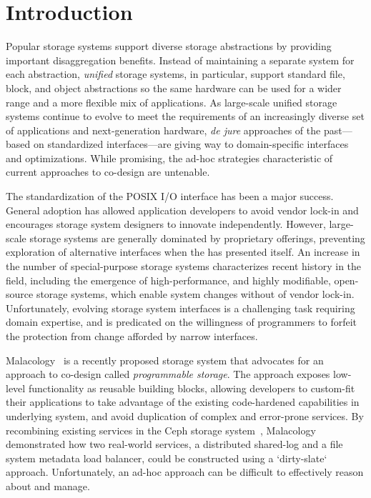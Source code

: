 \section{Introduction}
\label{sec:intro}

Popular storage systems support diverse storage abstractions by
providing important disaggregation benefits. Instead of maintaining
a separate system for each abstraction, \emph{unified} storage
systems, in particular, support standard file, block, and object abstractions so the same
hardware can be used for a wider range and a more flexible mix of applications. 
As large-scale unified storage systems continue to evolve to meet the requirements 
of an increasingly diverse set of applications and next-generation hardware, \emph{de jure}
approaches of the past---based on standardized interfaces---are giving way to
domain-specific interfaces and optimizations. While promising, the ad-hoc strategies characteristic of 
current approaches to co-design are untenable.

The standardization of the POSIX I/O interface has been a major success. General adoption
has allowed application developers to avoid vendor lock-in and encourages storage system
designers to innovate independently. However, large-scale storage systems are generally dominated 
by proprietary offerings, preventing exploration of alternative
interfaces when the has presented itself. An increase in the number of special-purpose storage systems characterizes recent history
in the field, including the emergence of high-performance, and highly modifiable, open-source storage systems, 
which enable system changes without of vendor lock-in. Unfortunately, evolving storage system
interfaces is a challenging task requiring domain expertise, and is predicated on the willingness of
programmers to forfeit the protection from change afforded by narrow
interfaces.

Malacology~\cite{sevilla:eurosys17} is a recently proposed storage system that
advocates for an approach to co-design called \emph{programmable storage}. The
approach exposes low-level functionality as reusable building
blocks, allowing developers to custom-fit their applications to take advantage
of the existing code-hardened capabilities in underlying system, and avoid
duplication of complex and error-prone services. By recombining existing
services in the Ceph storage system~\cite{weil:osdi2006-ceph}, Malacology
demonstrated how two
real-world services, a distributed shared-log and a file system metadata load
balancer, could be constructed using a `dirty-slate` approach. Unfortunately,
an ad-hoc approach can be difficult to effectively reason about and manage.

